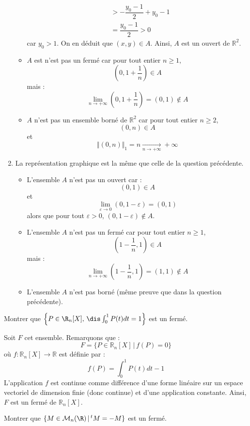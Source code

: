 \documentclass[a4paper,10pt]{report}
\begin{document}
\begin{enumerate}
\begin{itemize}
\begin{align*}
& > - \dfrac{y_0-1}{2} + y_0-1 \\
& = \dfrac{y_0-1}{2}>0
\end{align*}
car $y_0>1$. On en déduit que $(x,y) \in A$. Ainsi, $A$ est un ouvert de $\mathbb{R}^2$.
\item $A$ est n'est pas un fermé car pour tout entier $n \geq 1$,
$$ \left(0,1+ \dfrac{1}{n} \right) \in A$$
mais :
$$ \lim_{n \rightarrow + \infty} \left(0,1 + \dfrac{1}{n}\right) = (0,1) \notin A$$
\item $A$ n'est pas un ensemble borné de $\mathbb{R}^2$ car pour tout entier $n \geq 2$,
$$ (0,n) \in A$$
et 
$$ \Vert (0,n) \Vert_1 = n \underset{n \rightarrow + \infty}{\longrightarrow} + \infty$$
\end{itemize}
\item La représentation graphique est la même que celle de la question précédente. 
\begin{itemize}
\item L'ensemble $A$ n'est pas un ouvert car :
$$ (0,1) \in A$$
et 
$$ \lim_{\varepsilon \rightarrow 0} (0,1- \varepsilon) = (0,1)$$
alors que pour tout $\varepsilon>0$, $(0,1- \varepsilon) \notin A$. 
\item L'ensemble $A$ n'est pas un fermé car  pour tout entier $n \geq 1$,
$$ \left(1- \dfrac{1}{n},1\right) \in A$$
mais :
$$ \lim_{n \rightarrow + \infty} \left(1- \dfrac{1}{n},1\right) = (1,1) \notin A$$
\item L'ensemble $A$ n'est pas borné (même preuve que dans la question précédente).
\end{itemize}
\end{enumerate}

\begin{Exercice}{} Montrer que $\left\{P\in\R_n[X], \, \dis\int_0^1P(t)dt= 1\right\}$ est un fermé.
\end{Exercice}

\corr Soit $F$ cet ensemble. Remarquons que :
$$ F = \lbrace P \in \mathbb{R}_n[X] \, \vert \, f(P)=0 \rbrace$$
où $f: \mathbb{R}_n[X] \rightarrow \mathbb{R}$ est définie par :
$$ f(P)= \int_0^1P(t)dt-1$$
L'application $f$ est continue comme différence d'une forme linéaire sur un espace vectoriel de dimension finie (donc continue) et d'une application constante. Ainsi, $F$ est un fermé de $\mathbb{R}_n[X]$.

\begin{Exercice}{} Montrer que $\{M\in{\cal M}_n(\R) \, \vert \,  ^tM=-M\}$ est un fermé.
\end{Exercice}
\end{document}
